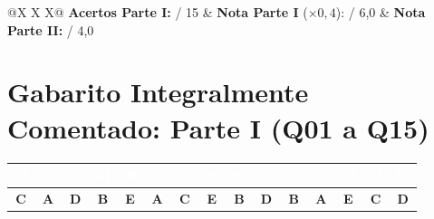 \vspace{10pt}
\begin{tcolorbox}[colback=bgGold, colframe=uefsGold, arc=3pt, boxrule=0.7pt, title={\bfseries Registro Rápido de Pontuação Final}, coltitle=white, colbacktitle=uefsGold]
\small
\begin{tabularx}{\textwidth}{@{}X X X@{}}
  \textbf{Acertos Parte I:} \underline{\hspace{1.2cm}} / 15 &
  \textbf{Nota Parte I} ($\times 0,4$): \underline{\hspace{1.2cm}} / 6,0 &
  \textbf{Nota Parte II:} \underline{\hspace{1.2cm}} / 4,0 \\[6pt]
\end{tabularx}
\end{tcolorbox}

\clearpage
\section*{Gabarito Integralmente Comentado: Parte I (Q01 a Q15)}

\begin{center}
\renewcommand{\arraystretch}{1.25}
\small
\begin{tabular}{|*{15}{c|}}
  \hline
  \rowcolor{uefsNavy}
  \textcolor{white}{\bfseries 01} & \textcolor{white}{\bfseries 02} & \textcolor{white}{\bfseries 03} &
  \textcolor{white}{\bfseries 04} & \textcolor{white}{\bfseries 05} & \textcolor{white}{\bfseries 06} &
  \textcolor{white}{\bfseries 07} & \textcolor{white}{\bfseries 08} & \textcolor{white}{\bfseries 09} &
  \textcolor{white}{\bfseries 10} & \textcolor{white}{\bfseries 11} & \textcolor{white}{\bfseries 12} &
  \textcolor{white}{\bfseries 13} & \textcolor{white}{\bfseries 14} & \textcolor{white}{\bfseries 15} \\
  \hline
  \textbf{C} & \textbf{A} & \textbf{D} & \textbf{B} & \textbf{E} &
  \textbf{A} & \textbf{C} & \textbf{E} & \textbf{B} & \textbf{D} &
  \textbf{B} & \textbf{A} & \textbf{E} & \textbf{C} & \textbf{D} \\
  \hline
\end{tabular}
\end{center}

